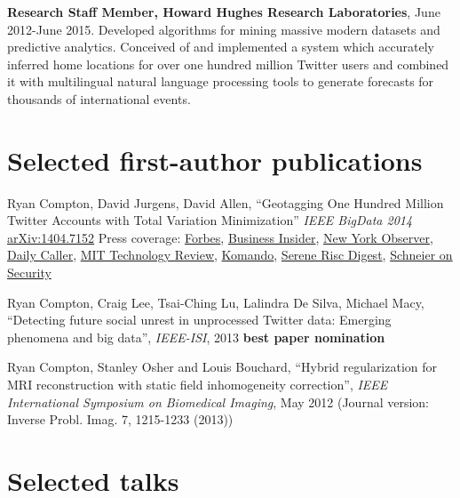 \documentclass[margin,line]{res}
\begin{document}
\begin{resume}
    {\bf Research Staff Member, Howard Hughes Research Laboratories}, June 2012-June 2015. Developed algorithms for mining massive modern datasets and predictive analytics. Conceived of and implemented a system which accurately inferred home locations for over one hundred million Twitter users and combined it with multilingual natural language processing tools to generate forecasts for thousands of international events.


\section{\sc Selected first-author publications}

Ryan Compton, David Jurgens, David Allen, ``Geotagging One Hundred Million Twitter Accounts with Total Variation Minimization'' {\it IEEE BigData 2014} \href{https://arxiv.org/abs/1404.7152}{arXiv:1404.7152} Press coverage: \href{http://www.forbes.com/sites/thomasbrewster/2015/03/07/twitter-location-can-be-determined-through-friends/}{Forbes}, \href{http://www.businessinsider.com/twitter-location-research-at-mentions-cornell-2015-3}{Business Insider}, \href{http://observer.com/2015/03/you-dont-have-to-geotag-your-tweets-to-give-away-your-location/}{New York Observer}, \href{http://dailycaller.com/2015/03/06/how-your-tweets-can-reveal-your-real-location/}{Daily Caller}, \href{http://www.technologyreview.com/view/527246/other-interesting-arxiv-papers-week-ending-may-10-2014/}{MIT Technology Review}, \href{http://www.komando.com/happening-now/299085/forget-gps-hackers-can-pinpoint-your-exact-location-using-social-media/all}{Komando}, \href{http://ryancompton.net/assets/resume/Serene_Risc_Digest_2015_Spring.pdf}{Serene Risc Digest}, \href{http://www.schneier.com/blog/archives/2015/03/geotagging_twit.html}{Schneier on Security}

Ryan Compton, Craig Lee, Tsai-Ching Lu, Lalindra De Silva, Michael Macy, ``Detecting future social unrest in unprocessed Twitter data: Emerging phenomena and big data'', {\it IEEE-ISI}, 2013 {\bf best paper nomination}

Ryan Compton, Stanley Osher and Louis Bouchard, ``Hybrid regularization for MRI reconstruction with static field inhomogeneity correction'', {\it IEEE International Symposium on Biomedical Imaging}, May 2012 (Journal version: Inverse Probl. Imag. 7, 1215-1233 (2013))

\section{\sc Selected talks}


\end{resume}
\end{document}
